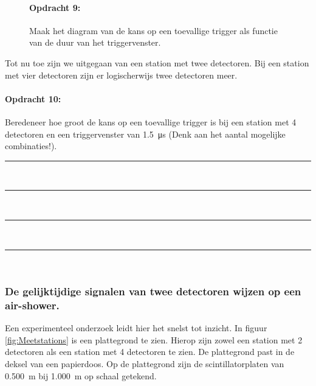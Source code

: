 \bigskip{}


\begin{figure}[ht]
    \paragraph{Opdracht 9:}

    Maak het diagram van de kans op een toevallige trigger als
    functie van de duur van het triggervenster.\bigskip{}

\end{figure}


\bigskip{}


Tot nu toe zijn we uitgegaan van een station met twee detectoren.
Bij een station met vier detectoren zijn er logischerwijs twee detectoren
meer.

\begin{minipage}[t]{1\columnwidth}%

\paragraph{Opdracht 10:}

Beredeneer hoe groot de kans op een toevallige trigger is
bij een station met 4 detectoren en een triggervenster van \SI{1.5}{\micro\second}
(Denk aan het aantal mogelijke combinaties!).

\begin{center}
    \rule{\textwidth}{0.3mm}\\
    \rule{\textwidth}{0.3mm}\\
    \rule{\textwidth}{0.3mm}\\
    \rule{\textwidth}{0.3mm}\\
\end{center}
\end{minipage}

\bigskip{}

\subsubsection{De gelijktijdige signalen van twee detectoren wijzen op
               een air-shower.}

Een experimenteel onderzoek leidt hier het snelst tot inzicht. In
figuur \ref{fig:Meetstations} is een plattegrond te zien. Hierop
zijn zowel een station met 2 detectoren als een station met 4 detectoren
te zien. De plattegrond past in de deksel van een papierdoos. Op de
plattegrond zijn de scintillatorplaten van \SI{0.500}{\meter} bij
\SI{1.000}{\meter} op schaal getekend. 

